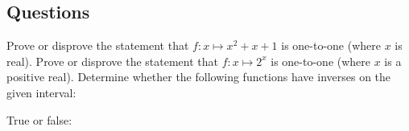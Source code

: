 \subsection*{Questions}
\begin{questions}
  \questioM Prove or disprove the statement that $ f : x \mapsto x^2 + x + 1 $ is one-to-one (where $ x $ is real).
  \questioM Prove or disprove the statement that $ f : x \mapsto 2^x $ is one-to-one (where $ x $ is a positive real).
  \questioM Determine whether the following functions have inverses on the given interval:
  \questioA True or false:
\end{questions}
